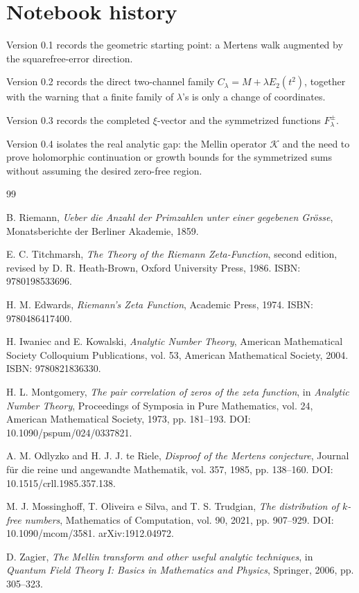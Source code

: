 \documentclass[11pt]{amsart}
\numberwithin{equation}{section}
\theoremstyle{plain}
\theoremstyle{definition}
\theoremstyle{remark}
\begin{document}
\section{Notebook history}
\label{sec:notebook_history}

Version 0.1 records the geometric starting point: a Mertens walk augmented by the squarefree-error direction.

Version 0.2 records the direct two-channel family \(C_\lambda=M+\lambda E_2(t^2)\), together with the warning that a finite family of \(\lambda\)'s is only a change of coordinates.

Version 0.3 records the completed \(\xi\)-vector and the symmetrized functions \(F_\lambda^\pm\).

Version 0.4 isolates the real analytic gap: the Mellin operator \(\mathcal K\) and the need to prove holomorphic continuation or growth bounds for the symmetrized sums without assuming the desired zero-free region.

\begin{thebibliography}{99}

B. Riemann,
\emph{Ueber die Anzahl der Primzahlen unter einer gegebenen Grösse},
Monatsberichte der Berliner Akademie, 1859.

E. C. Titchmarsh,
\emph{The Theory of the Riemann Zeta-Function},
second edition, revised by D. R. Heath-Brown,
Oxford University Press, 1986.
ISBN: 9780198533696.

H. M. Edwards,
\emph{Riemann's Zeta Function},
Academic Press, 1974.
ISBN: 9780486417400.

H. Iwaniec and E. Kowalski,
\emph{Analytic Number Theory},
American Mathematical Society Colloquium Publications, vol. 53,
American Mathematical Society, 2004.
ISBN: 9780821836330.

H. L. Montgomery,
\emph{The pair correlation of zeros of the zeta function},
in \emph{Analytic Number Theory},
Proceedings of Symposia in Pure Mathematics, vol. 24,
American Mathematical Society, 1973, pp. 181--193.
DOI: 10.1090/pspum/024/0337821.

A. M. Odlyzko and H. J. J. te Riele,
\emph{Disproof of the Mertens conjecture},
Journal f\"ur die reine und angewandte Mathematik, vol. 357, 1985, pp. 138--160.
DOI: 10.1515/crll.1985.357.138.

M. J. Mossinghoff, T. Oliveira e Silva, and T. S. Trudgian,
\emph{The distribution of \(k\)-free numbers},
Mathematics of Computation, vol. 90, 2021, pp. 907--929.
DOI: 10.1090/mcom/3581.
 arXiv:1912.04972.

D. Zagier,
\emph{The Mellin transform and other useful analytic techniques},
in \emph{Quantum Field Theory I: Basics in Mathematics and Physics},
Springer, 2006, pp. 305--323.

\end{thebibliography}
\end{document}

